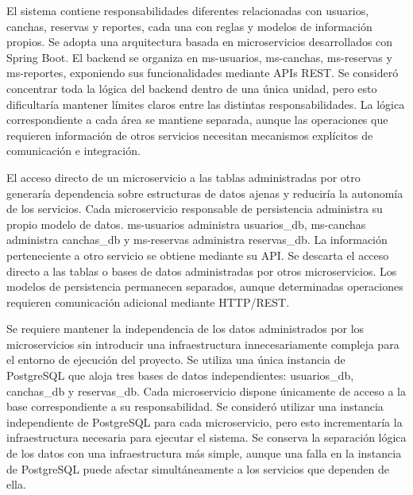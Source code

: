   {El sistema contiene responsabilidades diferentes relacionadas con usuarios,
  canchas, reservas y reportes, cada una con reglas y modelos de información
  propios.}
  {Se adopta una arquitectura basada en microservicios desarrollados con Spring
  Boot. El backend se organiza en ms-usuarios, ms-canchas, ms-reservas y
  ms-reportes, exponiendo sus funcionalidades mediante APIs REST.}
  {Se consideró concentrar toda la lógica del backend dentro de una única unidad,
  pero esto dificultaría mantener límites claros entre las distintas
  responsabilidades.}
  {La lógica correspondiente a cada área se mantiene separada, aunque las
  operaciones que requieren información de otros servicios necesitan mecanismos
  explícitos de comunicación e integración.}

  {El acceso directo de un microservicio a las tablas administradas por otro
  generaría dependencia sobre estructuras de datos ajenas y reduciría la autonomía
  de los servicios.}
  {Cada microservicio responsable de persistencia administra su propio modelo de
  datos. ms-usuarios administra usuarios\_db, ms-canchas administra canchas\_db
  y ms-reservas administra reservas\_db. La información perteneciente a otro
  servicio se obtiene mediante su API.}
  {Se descarta el acceso directo a las tablas o bases de datos administradas por
  otros microservicios.}
  {Los modelos de persistencia permanecen separados, aunque determinadas
  operaciones requieren comunicación adicional mediante HTTP/REST.}

  {Se requiere mantener la independencia de los datos administrados por los
  microservicios sin introducir una infraestructura innecesariamente compleja
  para el entorno de ejecución del proyecto.}
  {Se utiliza una única instancia de PostgreSQL que aloja tres bases de datos
  independientes: usuarios\_db, canchas\_db y reservas\_db. Cada microservicio
  dispone únicamente de acceso a la base correspondiente a su responsabilidad.}
  {Se consideró utilizar una instancia independiente de PostgreSQL para cada
  microservicio, pero esto incrementaría la infraestructura necesaria para
  ejecutar el sistema.}
  {Se conserva la separación lógica de los datos con una infraestructura más
  simple, aunque una falla en la instancia de PostgreSQL puede afectar
  simultáneamente a los servicios que dependen de ella.}

